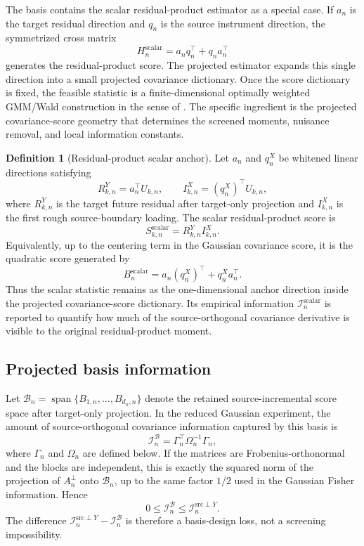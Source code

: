 \documentclass[11pt,a4paper]{amsart}
\theoremstyle{plain}
\theoremstyle{definition}
\newtheorem{definition}[theorem]{Definition}
\theoremstyle{remark}
\DeclareMathOperator{\spanop}{span}
\newcommand{\scrB}{\mathcal{B}}
\newcommand{\scrI}{\mathcal{I}}
\begin{document}
The basis contains the scalar residual-product estimator as a special case.  If \(a_n\) is the
target residual direction and \(q_n\) is the source instrument direction, the symmetrized cross
matrix
\[
        H_{n}^{\mathrm{scalar}}
        =
        a_n q_n^\top + q_n a_n^\top
\]
generates the residual-product score.  The projected estimator expands this single direction into a
small projected covariance dictionary.  Once the score dictionary is fixed, the feasible statistic
is a finite-dimensional optimally weighted GMM/Wald construction in the sense of
\cite{hansen1982gmm}.  The specific ingredient is the projected covariance-score geometry that
determines the screened moments, nuisance removal, and local information constants.

\begin{definition}[Residual-product scalar anchor]\label{def:scalar-anchor}
Let \(a_n\) and \(q_n^X\) be whitened linear directions satisfying
\[
        R_{k,n}^{Y}=a_n^\top U_{k,n},
        \qquad
        I_{k,n}^{X}=(q_n^X)^\top U_{k,n},
\]
where \(R_{k,n}^{Y}\) is the target future residual after target-only projection and
\(I_{k,n}^{X}\) is the first rough source-boundary loading.  The scalar residual-product score is
\[
        S_{k,n}^{\mathrm{scalar}}
        =
        R_{k,n}^{Y}I_{k,n}^{X}.
\]
Equivalently, up to the centering term in the Gaussian covariance score, it is the quadratic score
generated by
\[
        B_n^{\mathrm{scalar}}
        =
        a_n(q_n^X)^\top+q_n^Xa_n^\top.
\]
Thus the scalar statistic remains as the one-dimensional anchor direction inside the projected
covariance-score dictionary.  Its empirical information
\(\scrI_n^{\mathrm{scalar}}\) is reported to quantify how much of the source-orthogonal
covariance derivative is visible to the original residual-product moment.
\end{definition}

\subsection{Projected basis information}

Let \(\scrB_n=\spanop\{B_{1,n},\dots,B_{d_n,n}\}\) denote the retained source-incremental
score space after target-only projection.  In the reduced Gaussian experiment, the amount of
source-orthogonal covariance information captured by this basis is
\[
        \scrI_n^{\scrB}
        =
        \Gamma_n^\top\Omega_n^{-1}\Gamma_n,
\]
where \(\Gamma_n\) and \(\Omega_n\) are defined below.  If the matrices are Frobenius-orthonormal
and the blocks are independent, this is exactly the squared norm of the projection of
\(A_n^{\perp}\) onto \(\scrB_n\), up to the same factor \(1/2\) used in the Gaussian Fisher
information.  Hence
\[
        0\le \scrI_n^{\scrB}
        \le
        \scrI_n^{\mathrm{src}\perp Y}.
\]
The difference \(\scrI_n^{\mathrm{src}\perp Y}-\scrI_n^{\scrB}\) is therefore a basis-design loss,
not a screening impossibility.
\end{document}
